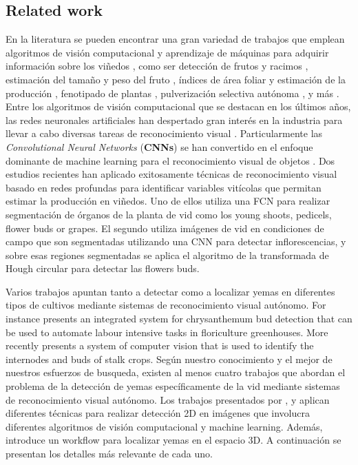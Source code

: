 \documentclass[a4paper,authoryear,review]{elsarticle}
\begin{document}
\subsection{Related work} \label{sec:related}

En la literatura se pueden encontrar una gran variedad de trabajos que emplean algoritmos de visión computacional y aprendizaje de máquinas para adquirir información sobre los viñedos \citep{seng2018computer}, como ser detección de frutos y racimos \citep{nuske2011yield}, estimación del tamaño y peso del fruto \citep{tardaguila2012automatic}, índices de área foliar y estimación de la producción \citep{diago2012grapevine}, fenotipado de plantas \citep{herzog2014initial}, pulverización selectiva autónoma \citep{berenstein2010grape}, y más \citep{tardaguila2012applications, whalley2013applications}. Entre los algoritmos de visión computacional que se destacan en los últimos años, las redes neuronales artificiales han despertado gran interés en la industria para llevar a cabo diversas tareas de reconocimiento visual \citep{hirano2006industry, kahng2017cti, tilgner2019multi}. Particularmente las \emph{Convolutional Neural Networks} (\textbf{CNNs}) se han convertido en el enfoque dominante de machine learning para el reconocimiento visual de objetos \citep{ning2017inception}. Dos estudios recientes han aplicado exitosamente técnicas de reconocimiento visual basado en redes profundas para identificar variables vitícolas que permitan estimar la producción en viñedos. Uno de ellos \citet{grimm2019adaptable} utiliza una FCN para realizar segmentación de órganos de la planta de vid como los young shoots, pedicels, flower buds or grapes. El segundo \citet{rudolph2018efficient} utiliza imágenes de vid en condiciones de campo que son segmentadas utilizando una CNN para detectar inflorescencias, y sobre esas regiones segmentadas se aplica el algoritmo de la transformada de Hough circular para detectar las flowers buds.

Varios trabajos apuntan tanto a detectar como a localizar yemas en diferentes tipos de cultivos mediante sistemas de reconocimiento visual autónomo. For instance \citet{tarry2014integrated} presents an integrated system for chrysanthemum bud detection that can be used to automate labour intensive tasks in floriculture greenhouses. More recently \citet{zhao2018research} presents a system  of  computer  vision  that is used  to  identify  the  internodes and  buds  of  stalk  crops. Según nuestro conocimiento y el mejor de nuestros esfuerzos de busqueda, existen al menos cuatro trabajos que abordan el problema de la detección de yemas específicamente de la vid mediante sistemas de reconocimiento visual autónomo. Los trabajos presentados por \citet{xu2014detection}, \citet{herzog2014objective} y \citet{perez2017image} aplican diferentes técnicas para realizar detección 2D en imágenes que involucra diferentes algoritmos de visión computacional y machine learning. Además, \citet{diaz2018grapevine} introduce un workflow para localizar yemas en el espacio 3D. A continuación se presentan los detalles más relevante de cada uno.
\end{document}
